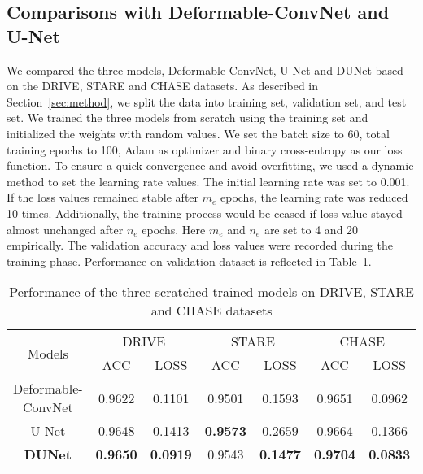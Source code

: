 \documentclass[journal]{IEEEtran}
\begin{document}
\subsection{Comparisons with Deformable-ConvNet and U-Net}
We compared the three models, Deformable-ConvNet, U-Net and DUNet based on the DRIVE, STARE and CHASE datasets. As described in Section~\ref{sec:method}, we split the data into training set, validation set, and test set. We trained the three models from scratch using the training set and initialized the weights with random values. We set the batch size to 60, total training epochs to 100, Adam as optimizer and binary cross-entropy as our loss function. To ensure a quick convergence and avoid overfitting, we used a dynamic method to set the learning rate values. The initial learning rate was set to 0.001. If the loss values remained stable after $m_{e}$ epochs, the learning rate was reduced 10 times. Additionally, the training process would be ceased if loss value stayed almost unchanged after $n_{e}$ epochs. Here $m_{e}$ and $n_{e}$ are set to 4 and 20 empirically. The validation accuracy and loss values were recorded during the training phase. Performance on validation dataset is reflected in Table~\ref{table:performance}.

\begin{table}[]
\caption{Performance of the three scratched-trained models on DRIVE, STARE and CHASE datasets}
\centering
\renewcommand\arraystretch{1.3}      
\renewcommand\tabcolsep{3.5pt}        
\begin{tabular}{ccccccc}
\toprule 
\multirow{2}{*}{Models} & \multicolumn{2}{c}{DRIVE}       & \multicolumn{2}{c}{STARE}         & \multicolumn{2}{c}{CHASE}   \\ \cline{2-7}
                        & ACC            & LOSS            & ACC             & LOSS            & ACC             & LOSS   \\ \hline
Deformable-ConvNet      & 0.9622         & 0.1101          & 0.9501          & 0.1593          & 0.9651     &0.0962\\ 
U-Net                   & 0.9648         & 0.1413          & \textbf{0.9573} & 0.2659          & 0.9664     &0.1366\\ 
\textbf{DUNet}                   & \textbf{0.9650} & \textbf{0.0919} & 0.9543         & \textbf{0.1477} & \textbf{0.9704}   &\textbf{0.0833}\\ 
\bottomrule 
\end{tabular}
\label{table:performance}
\end{table}
\end{document}
